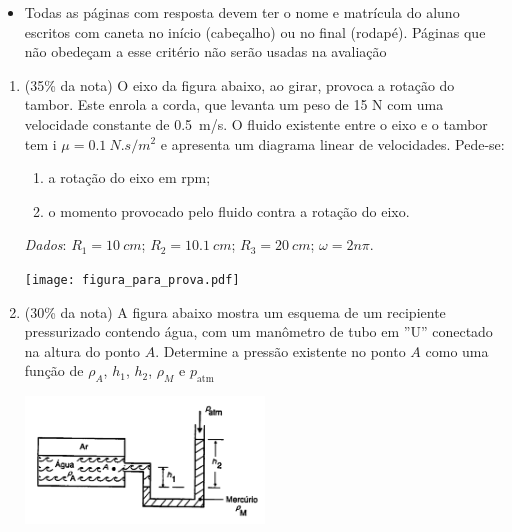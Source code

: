 \documentclass[12pt,a4paper,brazilian, fleqn]{article}
\newcommand{\ratio}[1]{(#1\% da nota)}
\begin{document}
\begin{tcolorbox}[colback=black!10, colframe=black!50, title=Observações]
    \begin{itemize}
        \item Todas as páginas com resposta devem ter o nome e matrícula do
            aluno escritos com caneta no início (cabeçalho) ou no final
            (rodapé). Páginas que não obedeçam a esse critério não serão usadas
            na avaliação
    \end{itemize}
\end{tcolorbox}

\vspace{2em}

\begin{enumerate}
    \item \ratio{35} O eixo da figura abaixo, ao girar, provoca a rotação do tambor.
        Este enrola a corda, que levanta um peso de 15 N com uma velocidade constante
        de \SI{0.5}{m/s}. O fluido existente entre o eixo e o tambor tem i
        \(\mu = \SI{0.1}{N.s/m^2}\) e apresenta um diagrama linear de velocidades.
        Pede-se:
        \begin{enumerate}
            \item a rotação do eixo em rpm;
            \item o momento provocado pelo fluido contra a rotação do eixo.
        \end{enumerate}
        \textit{Dados}: \(R_1 = \SI{10}{cm}\); \(R_2 = \SI{10.1}{cm}\);
        \(R_3 = \SI{20}{cm}\); \(\omega = 2 n \pi\).

        \begin{center}
            \texttt{[image: figura\_para\_prova.pdf]}
        \end{center}

        \newpage

    \item \ratio{30} A figura abaixo mostra um esquema de um recipiente pressurizado
        contendo água, com um manômetro de tubo em ''U'' conectado na altura do 
        ponto \(A\). Determine a pressão existente no ponto \(A\) como uma função
        de \(\rho_A\), \(h_1\), \(h_2\), \(\rho_M\) e \(p_\text{atm}\)

        \begin{center}
            \includegraphics[width=0.5\textwidth]{Captura de tela 2025-06-03 133507.png}
        \end{center}


\end{enumerate}
\end{document}
